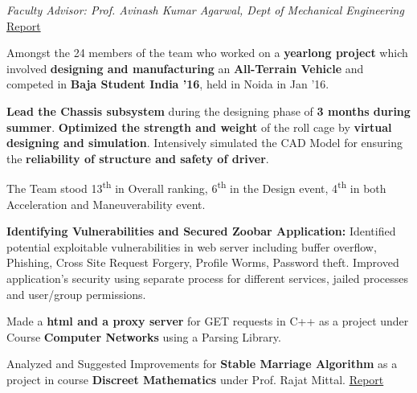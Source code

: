 \documentclass[a4paper]{norm-resume}
\begin{document}
    	
    \emph{Faculty Advisor: Prof. Avinash Kumar Agarwal, Dept of Mechanical Engineering} \hfill \small \href{https://tulsyan.github.io/files/projects/B16ChassisDesignReport.pdf}{Report}
    \vspace{3mm}
    \begin{tightitemize}
    \small
    {
    \item Amongst the 24 members of the team who worked on a \textbf{yearlong project} which involved \textbf{designing and manufacturing} an \textbf{All-Terrain Vehicle} and competed in \textbf{Baja Student India ’16}, held in Noida in Jan ’16.
    \item \textbf{Lead the Chassis subsystem} during the designing phase of \textbf{3 months during summer}. \textbf{Optimized the strength and weight} of the roll cage by \textbf{virtual designing and simulation}. Intensively simulated the CAD Model for ensuring the \textbf{reliability of structure and safety of driver}.
    }
    \item The Team stood 13\textsuperscript{th} in Overall ranking, 6\textsuperscript{th} in the Design event, 4\textsuperscript{th} in both Acceleration and Maneuverability event.
    \end{tightitemize}

    \vspace{5mm}


    \vspace{3mm}
    \begin{tightitemize}
    \small
    {
    \item \textbf{Identifying Vulnerabilities and Secured Zoobar Application:} Identified potential exploitable vulnerabilities in web server including buffer overflow, Phishing, Cross Site Request Forgery, Profile Worms, Password theft. Improved application's security using separate process for different services, jailed processes and user/group permissions.
    \item Made a \textbf{html and a proxy server} for GET requests in C++ as a project under Course \textbf{Computer Networks} using a Parsing Library.
    \item Analyzed and Suggested Improvements for \textbf{Stable Marriage Algorithm} as a project in course \textbf{Discreet Mathematics} under Prof. Rajat Mittal. \hfill \href{https://tulsyan.github.io/files/projects/CS201ProjectReport.pdf}{Report}
    }
    \end{tightitemize}
\end{document}
